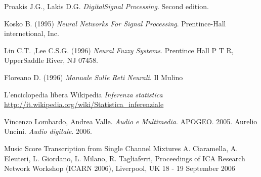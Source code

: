 \begin{thebibliography}{30}

     Proakis J.G., Lakis D.G. \emph{DigitalSignal Processing}. Second edition.
    
     Kosko B. (1995) \emph{Neural Networks For Signal
    Processing}. Prentince-Hall internetional, Inc.
    
    Lin C.T. ,Lee C.S.G. (1996) \emph{Neural Fuzzy
    Systems}. Prentince Hall P T R, UpperSaddle River, NJ 07458.
    
    Floreano D. (1996) \emph{Manuale Sulle Reti Neurali}. Il Mulino
    
     L'enciclopedia libera Wikipedia \emph{Inferenza
    statistica}\\
    \url{http://it.wikipedia.org/wiki/Statistica_inferenziale}
    
     Vincenzo Lombardo, Andrea Valle. \emph{Audio e Multimedia}.
    APOGEO. 2005.
     Aurelio Uncini. \emph{Audio digitale}. 2006.
    
    
     Music Score Transcription from Single Channel Mixtures
    A. Ciaramella, A. Eleuteri, L. Giordano, L. Milano, R.
    Tagliaferri, Proceedings of ICA Research Network Workshop (ICARN
    2006), Liverpool, UK 18 - 19 September 2006
    
    
    
    \end{thebibliography}
    
